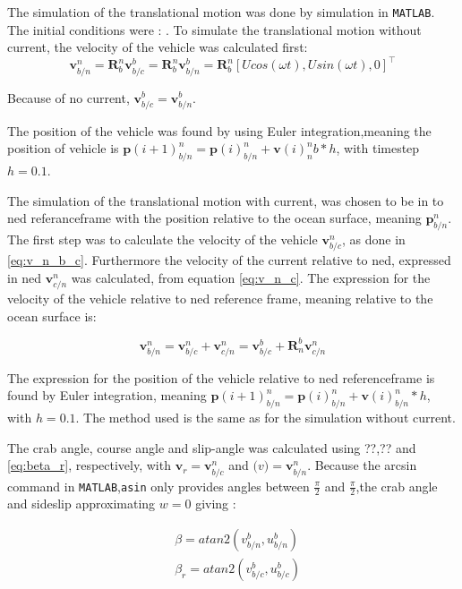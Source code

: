 The simulation of the translational motion was done by simulation in \texttt{MATLAB}. The initial conditions were : . To simulate the translational motion without current, the velocity of the vehicle was calculated first:
\begin{equation}
    \mathbf{v}^n_{b/n} = \mathbf{R}^n_b \mathbf{v}^b_{b/c} =\mathbf{R}^n_b \mathbf{v}^b_{b/n} = \mathbf{R}^n_b [U cos(\omega t), U sin(\omega t), 0]^\top
    \label{eq:v_n_b_c}
\end{equation}

Because of no current, $\mathbf{v}^b_{b/c} = \mathbf{v}^b_{b/n}$.

The position of the vehicle was found by using Euler integration,meaning the position of vehicle is $\mathbf{p}(i+1)^n_{b/n} = \mathbf{p}(i)^n_{b/n} + \mathbf{v}(i)^n_{n}b*h $, with timestep $h = 0.1$.
 
The  simulation of the translational motion with current, was chosen to be in to ned referanceframe with the position relative to the ocean surface, meaning $\mathbf{p}^n_{b/n}$. The first step was to calculate the velocity of the vehicle $\mathbf{v}^n_{b/c}$, as done in \eqref{eq:v_n_b_c}. Furthermore the velocity of the current relative to ned, expressed in ned $\mathbf{v}^n_{c/n}$ was calculated, from equation \eqref{eq:v_n_c}. The expression for the velocity of the vehicle relative to ned reference frame, meaning  relative to the ocean surface is:


\begin{equation}
    \mathbf{v}^n_{b/n} = \mathbf{v}^n_{b/c} + \mathbf{v}^n_{c/n} =  \boldsymbol{v}^b_{b/c} + \mathbf{R}^b_n \boldsymbol{v}^{n}_{c/n} 
    \label{eq:v_b_r}
\end{equation}

The expression for the position of the vehicle relative to ned referenceframe  is found by Euler integration, meaning $\mathbf{p}(i+1)^n_{b/n} = \mathbf{p}(i)^n_{b/n} + \mathbf{v}(i)^n_{b/n}*h $, with $h = 0.1$. The method used is the same as for the simulation without current.


The crab angle, course angle and slip-angle was calculated using ??,?? and \eqref{eq:beta_r}, respectively, with $\mathbf{v}_r = \mathbf{v}^n_{b/c}$ and $\mathbf(v) = \mathbf{v}^n_{b/n}$.  Because the arcsin command in \texttt{MATLAB},\texttt{asin} only provides angles between $\frac{\pi}{2}$ and $\frac{\pi}{2}$,the crab angle and sideslip  approximating $w= 0$ giving :

\begin{equation}
\begin{aligned}
	& \beta = atan2(v^b_{b/n}, u^b_{b/n} ) \\
	& \beta_r = atan2(v^b_{b/c}, u^b_{b/c} )  \\
	\label{eq:crab_slip_approx}
\end{aligned}
\end{equation}


